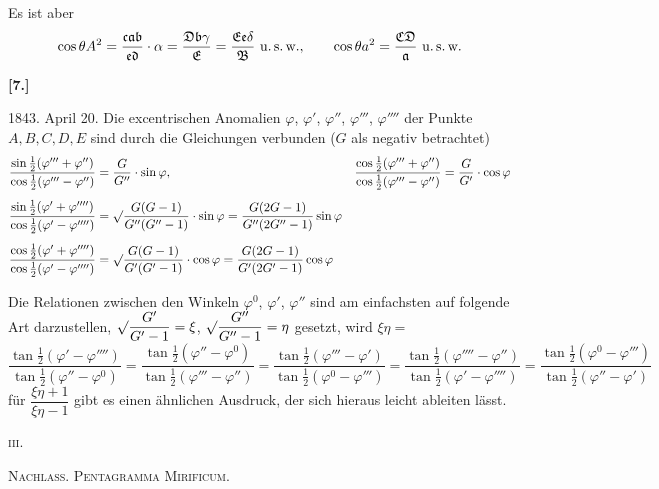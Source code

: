 \documentclass[12pt,a4paper]{article}
\newcommand{\tang}{\tan} %
\begin{document}
Es ist aber
\[
\cos\theta A^2 = \frac{\mathfrak{c}\mathfrak{a}\mathfrak{b}}{\mathfrak{e}\mathfrak{d}} \cdot \alpha
= \frac{\mathfrak{D}\mathfrak{b}\gamma}{\mathfrak{E}} = \frac{\mathfrak{E}\mathfrak{e}\delta}{\mathfrak{B}} \text{ u.\,s.\,w.}, \qquad
\cos\theta a^2 = \frac{\mathfrak{C}\mathfrak{D}}{\mathfrak{a}} \text{ u.\,s.\,w.}
\]

\vspace{1em}
\noindent\textbf{[7.]}

1843. April 20. Die excentrischen Anomalien $\varphi$, $\varphi'$, $\varphi''$, $\varphi'''$, $\varphi''''$
der Punkte $A, B, C, D, E$ sind durch die Gleichungen verbunden ($G$ als negativ betrachtet)
\begin{align*}
\frac{\sin\tfrac{1}{2}(\varphi''' + \varphi'')}{\cos\tfrac{1}{2}(\varphi''' - \varphi'')} &= \frac{G}{G''} \cdot \sin\varphi, &
\frac{\cos\tfrac{1}{2}(\varphi''' + \varphi'')}{\cos\tfrac{1}{2}(\varphi''' - \varphi'')} &= \frac{G}{G'} \cdot \cos\varphi \\[1ex]
\frac{\sin\tfrac{1}{2}(\varphi' + \varphi'''')}{\cos\tfrac{1}{2}(\varphi' - \varphi'''')} &=
\surd\frac{G(G-1)}{G''(G''-1)} \cdot \sin\varphi = \frac{G(2G-1)}{G''(2G''-1)} \sin\varphi \\[1ex]
\frac{\cos\tfrac{1}{2}(\varphi' + \varphi'''')}{\cos\tfrac{1}{2}(\varphi' - \varphi'''')} &=
\surd\frac{G(G-1)}{G'(G'-1)} \cdot \cos\varphi = \frac{G(2G-1)}{G'(2G'-1)} \cos\varphi
\end{align*}

Die Relationen zwischen den Winkeln $\varphi^0$, $\varphi'$, $\varphi''$ sind am einfachsten auf
folgende Art darzustellen, $\surd\dfrac{G'}{G'-1} = \xi$, $\surd\dfrac{G''}{G''-1} = \eta$ gesetzt, wird $\xi\eta =$
\[
\frac{\tang\tfrac{1}{2}(\varphi' - \varphi'''')}{\tang\tfrac{1}{2}(\varphi'' - \varphi^0)}
= \frac{\tang\tfrac{1}{2}(\varphi'' - \varphi^0)}{\tang\tfrac{1}{2}(\varphi''' - \varphi'')}
= \frac{\tang\tfrac{1}{2}(\varphi''' - \varphi')}{\tang\tfrac{1}{2}(\varphi^0 - \varphi''')}
= \frac{\tang\tfrac{1}{2}(\varphi'''' - \varphi'')}{\tang\tfrac{1}{2}(\varphi' - \varphi'''')}
= \frac{\tang\tfrac{1}{2}(\varphi^0 - \varphi''')}{\tang\tfrac{1}{2}(\varphi'' - \varphi')}
\]
f\"ur $\dfrac{\xi\eta+1}{\xi\eta-1}$ gibt es einen \"ahnlichen Ausdruck, der sich hieraus leicht ableiten l\"asst.

\hfill\textsc{iii.}

\vspace{1em}

\begin{center}
\textsc{Nachlass. \quad Pentagramma Mirificum.}
\end{center}
\end{document}

